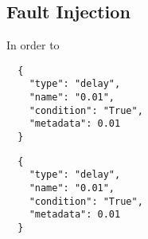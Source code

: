 \subsection{Fault Injection}
\label{subsec:fault_injection}
In order to 

\begin{multicols}{2}
  \begin{verbatim}
  {
    "type": "delay",
    "name": "0.01",
    "condition": "True",
    "metadata": 0.01
  }
  \end{verbatim}

  \columnbreak

  \begin{verbatim}
  {
    "type": "delay",
    "name": "0.01",
    "condition": "True",
    "metadata": 0.01
  }
  \end{verbatim}
\end{multicols}
